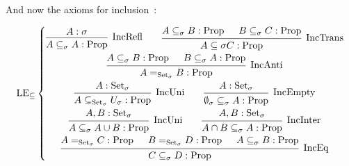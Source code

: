 \documentclass[]{article}
\newcommand{\1}{\mathbbm{1}}
\newcommand{\0}{\mathbbm{0}}
\newcommand{\Prop}{\text{Prop}}
\newcommand{\Set}{\text{Set}}
\newcommand{\sset}{{\Set_\sigma}}
\newcommand{\proof}[1]{{\scantokens{\begin{prooftree}#1\end{prooftree}}}}
\renewcommand{\subset}{\subseteq}
\begin{document}
And now the axioms for inclusion~:

\[\text{LE}_\subset\left\{
    \begin{gathered}
        \proof{
            \hypo{A:\sigma}
            \infer1[IncRefl]{A\subset_\sigma A : \Prop}
        }
        \qquad\proof{
            \hypo{A\subset_\sigma B : \Prop}
            \hypo{B\subset_\sigma C : \Prop}
            \infer2[IncTrans]{A\subset\sigma C:\Prop}
        }\\
        \proof{
            \hypo{A\subset_\sigma B : \Prop}
            \hypo{B\subset_\sigma A : \Prop}
            \infer2[IncAnti]{A =_\sset B : \Prop}
        }\\
        \proof{
            \hypo{A : \sset}
            \infer1[IncUni]{A\subset_\sset U_\sigma : \Prop}
        }
        \qquad\proof{
            \hypo{A : \sset}
            \infer1[IncEmpty]{\emptyset_\sigma\subset_\sigma A : \Prop}
        }\\
        \proof{
            \hypo{A, B : \sset}
            \infer1[IncUni]{A \subset_\sigma A\cup B : \Prop}
        }
        \qquad\proof{
            \hypo{A, B : \sset}
            \infer1[IncInter]{A\cap B\subset_\sigma A : \Prop}
        }\\
        \proof{
            \hypo{A=_\sset C : \Prop}
            \hypo{B=_\sset D : \Prop}
            \hypo{A \subset_\sigma B : \Prop}
            \infer3[IncEq]{C\subset_\sigma D : \Prop}
        }
    \end{gathered}
\right.\]
\end{document}
